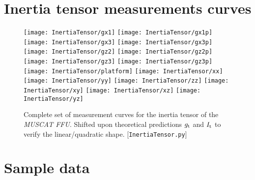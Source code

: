 \documentclass[journal]{IEEEtran}
\begin{document}
\onecolumn

\section{Inertia tensor measurements curves}

\begin{figure}[h]
	\centering
	\texttt{[image: InertiaTensor/gx1]}
	\texttt{[image: InertiaTensor/gx1p]}
	\texttt{[image: InertiaTensor/gx3]}
	\texttt{[image: InertiaTensor/gx3p]}
	\texttt{[image: InertiaTensor/gz2]}
	\texttt{[image: InertiaTensor/gz2p]}
	\texttt{[image: InertiaTensor/gz3]}
	\texttt{[image: InertiaTensor/gz3p]}
	\texttt{[image: InertiaTensor/platform]}
	\texttt{[image: InertiaTensor/xx]}
	\texttt{[image: InertiaTensor/yy]}
	\texttt{[image: InertiaTensor/zz]}
	\texttt{[image: InertiaTensor/xy]}
	\texttt{[image: InertiaTensor/xz]}
	\texttt{[image: InertiaTensor/yz]}
	\caption{Complete set of measurement curves for the inertia tensor of the \emph{MUSCAT FFU}. Shifted upon theoretical predictions $g_{\textup{t}}$ and $I_{\textup{t}}$ to verify the linear/quadratic shape. [\texttt{InertiaTensor.py}]}
	\label{fig:FFU}
\end{figure}


\clearpage

\section{Sample data}


\end{document}
